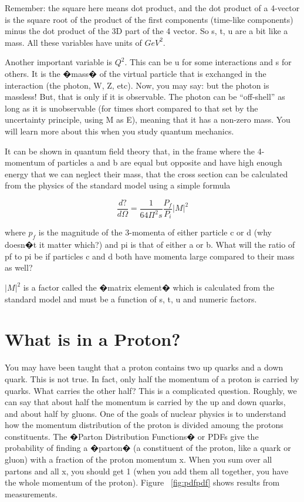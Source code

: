Remember: the square here means dot product, and the dot product of a 4-vector is the square root of the product of the first components (time-like components) minus the dot product of the 3D part of the 4 vector.  So s, t, u are a bit like a mass.  All these variables have units of \(GeV^{2}\).

Another important variable is \(Q^{2}\).  This can be u for some interactions and s for others.  It is the �mass� of the virtual particle that is exchanged in the interaction (the photon, W, Z, etc).  
Now, you may say: but the photon is massless!  But, that is only if it is observable.  The photon can be ``off-shell'' as long as it is unobservable (for times short compared to that set by the uncertainty principle, using M as E), meaning that it has a non-zero mass.  You will learn more about this when you study quantum mechanics.

It can be shown in quantum field theory that, in the frame where the 4-momentum of particles a and b are equal but opposite and have high enough energy that we can neglect their mass, that the cross section can be calculated from the physics of the standard model using a simple formula

\begin{equation}
\frac{d?}{d\Omega} = \frac{1}{64\Pi^{2}s}\frac{P_{f}}{P_{i}}|M|^{2}
\end{equation}

where \(p_{f}\) is the magnitude of the 3-momenta of either particle c or d (why doesn�t it matter which?) and pi is that of either a or b.  What will the ratio of pf to pi be if particles c and d both have momenta large compared to their mass as well?

\(|M|^{2}\)  is a factor called the �matrix element� which is calculated from the standard model and must be a function of s, t, u and numeric factors.

\section{What is in a Proton?}
You may have been taught that a proton contains two up quarks and a down quark.  This is not true.  In fact, only half the momentum of a proton is carried by quarks.  What carries the other half?  This is a complicated question.  Roughly, we can say that about half the momentum is carried by the up and down quarks, and about half by gluons.  One of the goals of nuclear physics is to understand how the momentum distribution of the proton is divided amoung the protons constituents.  The �Parton Distribution Functions� or PDFs give the probability of finding a �parton� (a constituent of the proton, like a quark or gluon) with a fraction of the proton momentum x.  When you sum over all partons and all x, you should get 1 (when you add them all together, you have the whole momentum of the proton).  Figure ~\ref{fig:pdfpdf} shows results from measurements.

